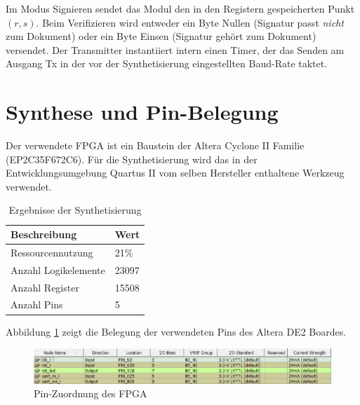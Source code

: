 Im Modus Signieren sendet das Modul den in den Registern gespeicherten Punkt $(r, s)$. Beim Verifizieren wird entweder ein Byte Nullen (Signatur passt \textit{nicht} zum Dokument) oder ein Byte Einsen (Signatur gehört zum Dokument) versendet. Der Transmitter instantiiert intern einen Timer, der das Senden am Ausgang Tx in der vor der Synthetisierung eingestellten Baud-Rate taktet. \\



\section{Synthese und Pin-Belegung}

Der verwendete FPGA ist ein Baustein der Altera Cyclone II Familie (EP2C35F672C6). Für die Synthetisierung wird das in der Entwicklungsumgebung Quartus II vom selben Hersteller enthaltene Werkzeug verwendet. \\

\begin{table} [h]
	\centering 
	\begin{tabular}{ | p{6cm} | p{3cm} | }
		\hline
		\textbf{Beschreibung} & \textbf{Wert}\\
		\hline
		Ressourcennutzung & 21\% \\
		\hline
		Anzahl Logikelemente & 23097 \\
		\hline
		Anzahl Register & 15508 \\
		\hline
		Anzahl Pins & 5 \\
		\hline
	\end{tabular}
	\caption{Ergebnisse der Synthetisierung}
	\label{tab:vhdl-impl-de2}
\end{table}

Abbildung \ref{fig:pins} zeigt die Belegung der verwendeten Pins des Altera DE2 Boardes.

\begin{figure}[H]
	\centering
	\includegraphics[width=\textwidth]{bilder/pins}
	\caption{Pin-Zuordnung des FPGA}
	\label{fig:pins}
\end{figure}

